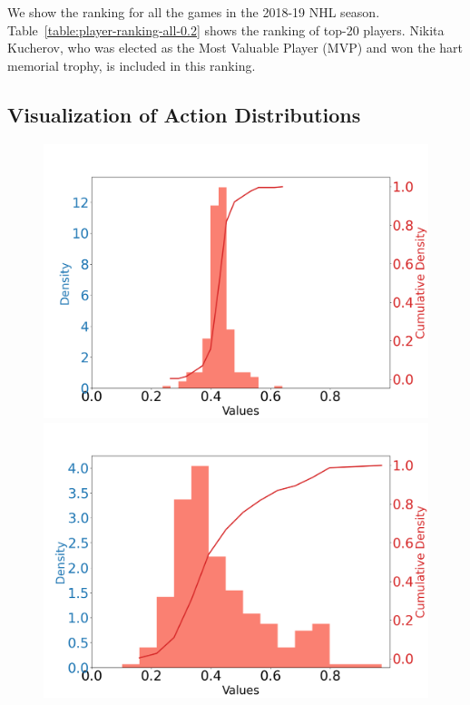 \documentclass{article}
\begin{document}
We show the ranking for all the games in the 2018-19 NHL season. Table~\ref{table:player-ranking-all-0.2} shows the ranking of top-20 players. Nikita Kucherov, who was elected as the Most Valuable Player (MVP) and won the hart memorial trophy, is included in this ranking.

\subsection{Visualization of Action Distributions}

\begin{figure}[htbp]
    \begin{minipage}{0.195\textwidth}
    \centering
    \includegraphics[scale=0.08]{figures/shot_density_idx_0_XCoord:9.24_YCoord:19.87.png}
    \end{minipage}
    \begin{minipage}{0.195\textwidth}
    \centering
    \includegraphics[scale=0.08]{figures/shot_density_idx_16_XCoord:79.27_YCoord:5.78.png}

\end{minipage}
\end{figure}
\end{document}

